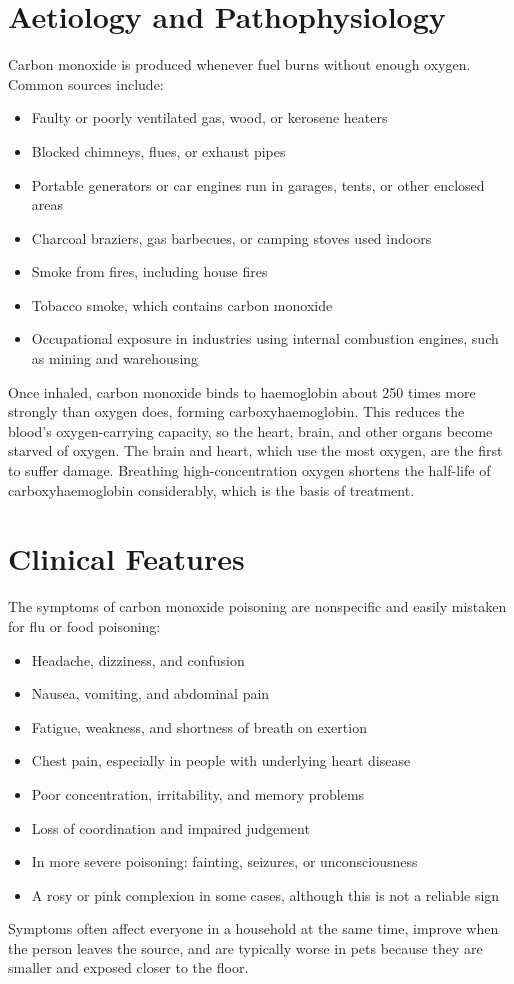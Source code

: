 \section*{Aetiology and Pathophysiology}
Carbon monoxide is produced whenever fuel burns without enough oxygen. Common sources include:
\begin{itemize}
    \item Faulty or poorly ventilated gas, wood, or kerosene heaters
    \item Blocked chimneys, flues, or exhaust pipes
    \item Portable generators or car engines run in garages, tents, or other enclosed areas
    \item Charcoal braziers, gas barbecues, or camping stoves used indoors
    \item Smoke from fires, including house fires
    \item Tobacco smoke, which contains carbon monoxide
    \item Occupational exposure in industries using internal combustion engines, such as mining and warehousing
\end{itemize}
Once inhaled, carbon monoxide binds to haemoglobin about 250 times more strongly than oxygen does, forming carboxyhaemoglobin. This reduces the blood's oxygen-carrying capacity, so the heart, brain, and other organs become starved of oxygen. The brain and heart, which use the most oxygen, are the first to suffer damage. Breathing high-concentration oxygen shortens the half-life of carboxyhaemoglobin considerably, which is the basis of treatment.

\section*{Clinical Features}
The symptoms of carbon monoxide poisoning are nonspecific and easily mistaken for flu or food poisoning:
\begin{itemize}
    \item Headache, dizziness, and confusion
    \item Nausea, vomiting, and abdominal pain
    \item Fatigue, weakness, and shortness of breath on exertion
    \item Chest pain, especially in people with underlying heart disease
    \item Poor concentration, irritability, and memory problems
    \item Loss of coordination and impaired judgement
    \item In more severe poisoning: fainting, seizures, or unconsciousness
    \item A rosy or pink complexion in some cases, although this is not a reliable sign
\end{itemize}
Symptoms often affect everyone in a household at the same time, improve when the person leaves the source, and are typically worse in pets because they are smaller and exposed closer to the floor.

